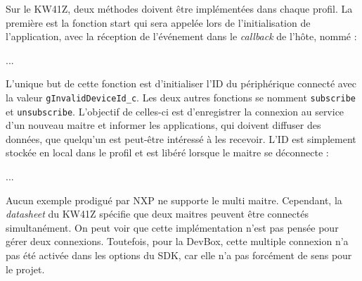 Sur le KW41Z, deux méthodes doivent être implémentées dans chaque profil. La première est la fonction start qui sera appelée lors de l'initialisation de l'application, avec la réception de l'événement  dans le \textit{callback} de l'hôte, nommé  : 

\begin{tcolorbox}
  [top=-1mm, bottom=-3mm, left=0mm, right=0mm, enhanced,breakable,
  attach boxed title to top center={yshift=-3mm,yshifttext=-1mm},colback=LightGray,colframe=DarkGray,
  colbacktitle=DarkGray, fonttitle=\footnotesize\bfseries,boxed title style={size=small,colframe=DarkGray},
  title=\texttt{dev\_box\_app\_task.c}]


...
\end{tcolorbox}

L'unique but de cette fonction est d'initialiser l'ID du périphérique connecté avec la valeur \texttt{gInvalidDeviceId\_c}. Les deux autres fonctions se nomment \texttt{subscribe} et \texttt{unsubscribe}.
L'objectif de celles-ci est d'enregistrer la connexion au service d'un nouveau maitre et informer les applications, qui doivent diffuser des données, que quelqu'un est peut-être intéressé à les recevoir. L'ID est simplement stockée en local dans le profil et est libéré lorsque le maitre se déconnecte : 
\begin{tcolorbox}
  [top=-1mm, bottom=-3mm, left=0mm, right=0mm, enhanced,breakable,
  attach boxed title to top center={yshift=-3mm,yshifttext=-1mm},colback=LightGray,colframe=DarkGray,
  colbacktitle=DarkGray, fonttitle=\footnotesize\bfseries,boxed title style={size=small,colframe=DarkGray},
  title=\texttt{smartcanton\_devbox\_gps\_service.c} ]
  

...
\end{tcolorbox}

Aucun exemple prodigué par NXP ne supporte le multi maitre. Cependant, la \textit{datasheet} du KW41Z spécifie que deux maitres peuvent être connectés simultanément. On peut voir que cette implémentation n'est pas pensée pour gérer deux connexions. Toutefois, pour la DevBox, cette multiple connexion n'a pas été activée dans les options du SDK, car elle n'a pas forcément de sens pour le projet.


